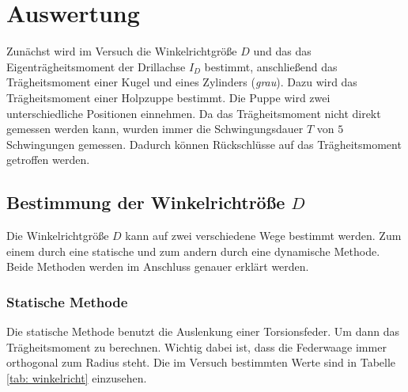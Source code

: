 \section{Auswertung}

Zunächst wird im Versuch die Winkelrichtgröße $D$ und das
das Eigenträgheitsmoment der Drillachse $I_D$ bestimmt, %
anschließend das Trägheitsmoment einer Kugel und eines Zylinders (\emph{grau}).
Dazu wird das Trägheitsmoment einer Holpzuppe bestimmt. 
Die Puppe wird zwei unterschiedliche Positionen einnehmen.%
Da das Trägheitsmoment nicht direkt gemessen werden kann, wurden immer
die Schwingungsdauer $T$ von $5$ Schwingungen gemessen.
Dadurch können Rückschlüsse auf das Trägheitsmoment getroffen werden. %

\subsection{Bestimmung der Winkelrichtröße $D$}

Die Winkelrichtgröße $D$ kann auf zwei verschiedene Wege bestimmt werden.
Zum einem durch eine statische und zum andern durch eine dynamische Methode. %
Beide Methoden werden im Anschluss genauer erklärt werden.

\subsubsection{Statische Methode}

Die statische Methode benutzt die Auslenkung 
einer Torsionsfeder. Um dann das Trägheitsmoment zu berechnen. %
Wichtig dabei ist, dass die Federwaage immer orthogonal zum Radius steht.
Die im Versuch bestimmten Werte sind in Tabelle \ref{tab: winkelricht} einzusehen.

